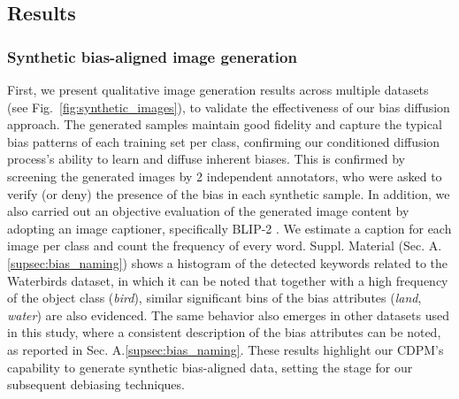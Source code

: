 \subsection{Results}
\subsubsection{Synthetic bias-aligned image generation}
First, we present qualitative image generation results across multiple datasets (see Fig.~\ref{fig:synthetic_images}), to validate the effectiveness of our bias diffusion approach. 
The generated samples maintain good fidelity and capture the typical bias patterns of each training set per class, confirming our conditioned diffusion process's ability to learn and diffuse inherent biases. 
This is confirmed by screening the generated images by 2 independent annotators, who were asked to verify (or deny) the presence of the bias in each synthetic sample.
In addition, we also carried out an objective evaluation of the generated image content by adopting an image captioner, specifically BLIP-2 \cite{DBLP:conf/icml/0008LSH23}. We estimate a caption for each image per class and count the frequency of every word. Suppl. Material (Sec. A.\ref{supsec:bias_naming}) shows a histogram of the detected keywords related to the Waterbirds dataset, in which it can be noted that together with a high frequency of the object class (\textit{bird}), similar significant bins of the bias attributes (\textit{land}, \textit{water}) are also evidenced. The same behavior also emerges in other datasets used in this study, where a consistent description of the bias attributes can be noted, as reported in Sec. A.\ref{supsec:bias_naming}. These results highlight our CDPM's capability to generate synthetic bias-aligned data, setting the stage for our subsequent debiasing techniques.
